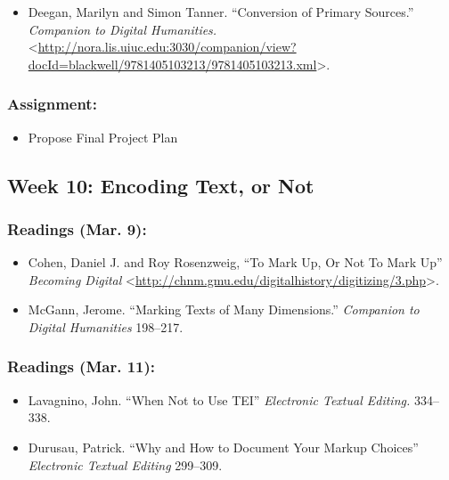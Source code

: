 \documentclass[]{article}
\begin{document}
\begin{itemize}
\itemsep1pt\parskip0pt
\item
  Deegan, Marilyn and Simon Tanner. ``Conversion of Primary Sources.''
  \emph{Companion to Digital Humanities.}
  \textless{}\url{http://nora.lis.uiuc.edu:3030/companion/view?docId=blackwell/9781405103213/9781405103213.xml}\textgreater{}.
\end{itemize}

\subsubsection{Assignment:}\label{assignment-3}

\begin{itemize}
\itemsep1pt\parskip0pt
\item
  Propose Final Project Plan
\end{itemize}

\subsection{Week 10: Encoding Text, or
Not}\label{week-10-encoding-text-or-not}

\subsubsection{Readings (Mar. 9):}\label{readings-mar.-9}

\begin{itemize}
\itemsep1pt\parskip0pt
\item
  Cohen, Daniel J. and Roy Rosenzweig, ``To Mark Up, Or Not To Mark Up''
  \emph{Becoming Digital}
  \textless{}\url{http://chnm.gmu.edu/digitalhistory/digitizing/3.php}\textgreater{}.
\item
  McGann, Jerome. ``Marking Texts of Many Dimensions.'' \emph{Companion
  to Digital Humanities} 198--217.
\end{itemize}

\subsubsection{Readings (Mar. 11):}\label{readings-mar.-11}

\begin{itemize}
\itemsep1pt\parskip0pt
\item
  Lavagnino, John. ``When Not to Use TEI'' \emph{Electronic Textual
  Editing.} 334--338.
\item
  Durusau, Patrick. ``Why and How to Document Your Markup Choices''
  \emph{Electronic Textual Editing} 299--309.
\end{itemize}
\end{document}
